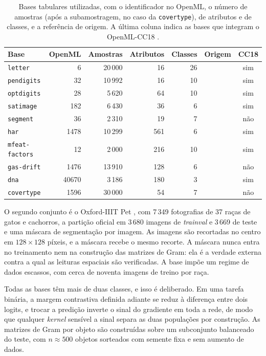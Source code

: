 \begin{table}[htbp]
\centering
\caption{Bases tabulares utilizadas, com o identificador no OpenML, o número de amostras (após a subamostragem, no caso da \texttt{covertype}), de atributos e de classes, e a referência de origem. A última coluna indica as bases que integram o OpenML-CC18 \citep{Bischl2021}.}
\label{tab:bases}
\footnotesize
\setlength{\tabcolsep}{4pt}
\begin{tabular}{l r r r r l c}
\hline
Base & OpenML & Amostras & Atributos & Classes & Origem & CC18 \\
\hline
\texttt{letter} & 6 & 20\,000 & 16 & 26 & \citet{FreySlate1991} & sim \\
\texttt{pendigits} & 32 & 10\,992 & 16 & 10 & \citet{UCIPendigits} & sim \\
\texttt{optdigits} & 28 & 5\,620 & 64 & 10 & \citet{AlpaydinKaynak1998} & sim \\
\texttt{satimage} & 182 & 6\,430 & 36 & 6 & \citet{UCISatimage} & sim \\
\texttt{segment} & 36 & 2\,310 & 19 & 7 & \citet{UCISegment} & não \\
\texttt{har} & 1478 & 10\,299 & 561 & 6 & \citet{Anguita2013} & sim \\
\texttt{mfeat-factors} & 12 & 2\,000 & 216 & 10 & \citet{vanBreukelen1998} & sim \\
\texttt{gas-drift} & 1476 & 13\,910 & 128 & 6 & \citet{Vergara2012} & não \\
\texttt{dna} & 40670 & 3\,186 & 180 & 3 & \citet{Michie1994} & sim \\
\texttt{covertype} & 1596 & 30\,000 & 54 & 7 & \citet{Blackard1999} & não \\
\hline
\end{tabular}
\end{table}

O segundo conjunto é o Oxford-IIIT Pet \citep{Parkhi2012}, com 7\,349 fotografias de 37 raças de gatos e cachorros, a partição oficial em 3\,680 imagens de \textit{trainval} e 3\,669 de teste e uma máscara de segmentação por imagem. As imagens são recortadas no centro em $128\times128$ píxeis, e a máscara recebe o mesmo recorte. A máscara nunca entra no treinamento nem na construção das matrizes de Gram: ela é a verdade externa contra a qual as leituras espaciais são verificadas. A base impõe um regime de dados escassos, com cerca de noventa imagens de treino por raça.

Todas as bases têm mais de duas classes, e isso é deliberado. Em uma tarefa binária, a margem contrastiva definida adiante se reduz à diferença entre dois logits, e trocar a predição inverte o sinal do gradiente em toda a rede, de modo que qualquer \textit{kernel} sensível a sinal separa as duas populações por construção. As matrizes de Gram por objeto são construídas sobre um subconjunto balanceado do teste, com $n \approx 500$ objetos sorteados com semente fixa e sem aumento de dados.

